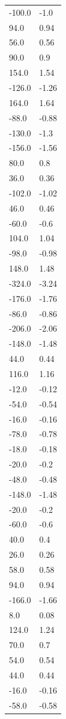\begin{longtable}{ll}
-100.0 & -1.0 \\
94.0 & 0.94 \\
56.0 & 0.56 \\
90.0 & 0.9 \\
154.0 & 1.54 \\
-126.0 & -1.26 \\
164.0 & 1.64 \\
-88.0 & -0.88 \\
-130.0 & -1.3 \\
-156.0 & -1.56 \\
80.0 & 0.8 \\
36.0 & 0.36 \\
-102.0 & -1.02 \\
46.0 & 0.46 \\
-60.0 & -0.6 \\
104.0 & 1.04 \\
-98.0 & -0.98 \\
148.0 & 1.48 \\
-324.0 & -3.24 \\
-176.0 & -1.76 \\
-86.0 & -0.86 \\
-206.0 & -2.06 \\
-148.0 & -1.48 \\
44.0 & 0.44 \\
116.0 & 1.16 \\
-12.0 & -0.12 \\
-54.0 & -0.54 \\
-16.0 & -0.16 \\
-78.0 & -0.78 \\
-18.0 & -0.18 \\
-20.0 & -0.2 \\
-48.0 & -0.48 \\
-148.0 & -1.48 \\
-20.0 & -0.2 \\
-60.0 & -0.6 \\
40.0 & 0.4 \\
26.0 & 0.26 \\
58.0 & 0.58 \\
94.0 & 0.94 \\
-166.0 & -1.66 \\
8.0 & 0.08 \\
124.0 & 1.24 \\
70.0 & 0.7 \\
54.0 & 0.54 \\
44.0 & 0.44 \\
-16.0 & -0.16 \\
-58.0 & -0.58 \\

\end{longtable}

